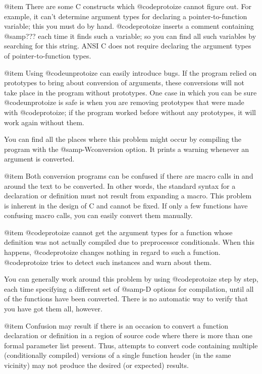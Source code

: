 @item
There are some C constructs which @code{protoize} cannot figure out.
For example, it can't determine argument types for declaring a
pointer-to-function variable; this you must do by hand.  @code{protoize}
inserts a comment containing @samp{???} each time it finds such a
variable; so you can find all such variables by searching for this
string.  ANSI C does not require declaring the argument types of
pointer-to-function types.

@item
Using @code{unprotoize} can easily introduce bugs.  If the program
relied on prototypes to bring about conversion of arguments, these
conversions will not take place in the program without prototypes.
One case in which you can be sure @code{unprotoize} is safe is when
you are removing prototypes that were made with @code{protoize}; if
the program worked before without any prototypes, it will work again
without them.

You can find all the places where this problem might occur by compiling
the program with the @samp{-Wconversion} option.  It prints a warning
whenever an argument is converted.

@item
Both conversion programs can be confused if there are macro calls in and
around the text to be converted.  In other words, the standard syntax
for a declaration or definition must not result from expanding a macro.
This problem is inherent in the design of C and cannot be fixed.  If
only a few functions have confusing macro calls, you can easily convert
them manually.

@item
@code{protoize} cannot get the argument types for a function whose
definition was not actually compiled due to preprocessor conditionals.
When this happens, @code{protoize} changes nothing in regard to such 
a function.  @code{protoize} tries to detect such instances and warn
about them.

You can generally work around this problem by using @code{protoize} step
by step, each time specifying a different set of @samp{-D} options for
compilation, until all of the functions have been converted.  There is
no automatic way to verify that you have got them all, however.

@item
Confusion may result if there is an occasion to convert a function
declaration or definition in a region of source code where there is more
than one formal parameter list present.  Thus, attempts to convert code
containing multiple (conditionally compiled) versions of a single
function header (in the same vicinity) may not produce the desired (or
expected) results.

